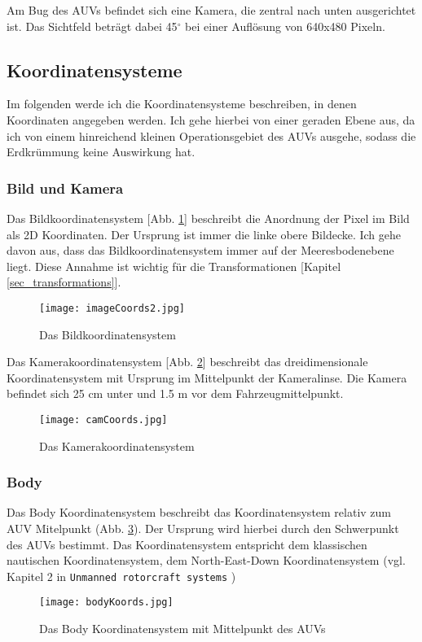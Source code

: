 Am Bug des AUVs befindet sich eine Kamera, die zentral nach unten ausgerichtet ist. Das Sichtfeld beträgt dabei 45$^\circ$ bei einer Auflösung von 640x480 Pixeln.
\subsection{Koordinatensysteme}

Im folgenden werde ich die Koordinatensysteme beschreiben, in denen Koordinaten angegeben werden. Ich gehe hierbei von einer geraden Ebene aus, da ich von einem hinreichend kleinen Operationsgebiet des AUVs ausgehe, sodass die Erdkrümmung keine Auswirkung hat.
\subsubsection{Bild und Kamera}
\label{sec_img_cam_coords}
Das Bildkoordinatensystem [Abb. \ref{imageKoords}] beschreibt die Anordnung der Pixel im Bild als 2D Koordinaten. Der Ursprung ist immer die linke obere Bildecke. Ich gehe davon aus, dass das Bildkoordinatensystem immer auf der Meeresbodenebene liegt. Diese Annahme ist wichtig für die Transformationen [Kapitel \ref{sec_transformations}].
\begin{figure}[H]
	\centering
	\texttt{[image: imageCoords2.jpg]}
	\caption{Das Bildkoordinatensystem}
	\label{imageKoords}
\end{figure}
Das Kamerakoordinatensystem [Abb. \ref{CamKoords}] beschreibt das dreidimensionale Koordinatensystem mit Ursprung im Mittelpunkt der Kameralinse. Die Kamera befindet sich 25 cm unter und 1.5 m vor dem Fahrzeugmittelpunkt.
\begin{figure}[H]
	\centering
	\texttt{[image: camCoords.jpg]}
	\caption{Das Kamerakoordinatensystem}
	\label{CamKoords}
\end{figure}

\subsubsection{Body}
Das Body Koordinatensystem beschreibt das Koordinatensystem relativ zum AUV Mitelpunkt (Abb. \ref{Abb. 1}).
Der Ursprung wird hierbei durch den Schwerpunkt des AUVs bestimmt.
Das Koordinatensystem entspricht dem klassischen nautischen Koordinatensystem, dem North-East-Down Koordinatensystem (vgl. Kapitel 2 in \texttt{Unmanned rotorcraft systems} \cite{cai2011unmanned})
\begin{figure}[H]
	\centering
	\texttt{[image: bodyKoords.jpg]}
	\caption{Das Body Koordinatensystem mit Mittelpunkt des AUVs}
	\label{Abb. 1}
\end{figure}


